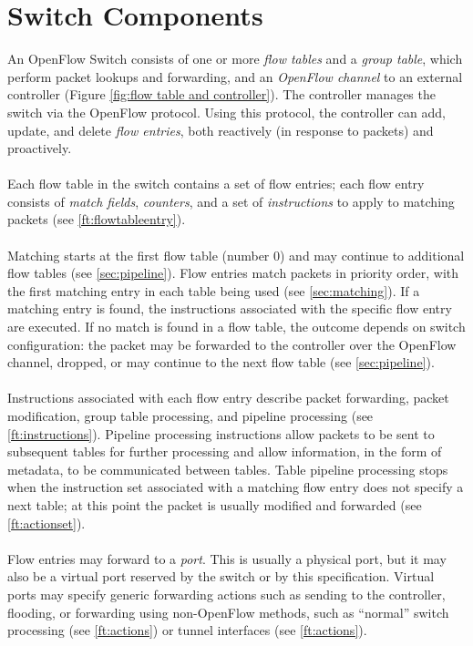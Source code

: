 \documentclass[10pt]{article}
\begin{document}
\section{Switch Components}
An OpenFlow Switch consists of one or more \emph{flow tables} and a \emph{group table}, which perform packet lookups and forwarding, and an \emph{OpenFlow channel} to an external controller (Figure \ref{fig:flow table and controller}).  The controller manages the switch via the OpenFlow protocol.   Using this protocol, the controller can add, update, and delete \emph{flow entries}, both reactively (in response to packets) and proactively.
\\\\
Each flow table in the switch contains a set of flow entries; each flow entry consists of \emph{match fields}, \emph{counters}, and a set of \emph{instructions} to apply to matching packets (see \ref{ft:flowtableentry}).
\\\\
Matching starts at the first flow table (number 0) and may continue to additional flow tables (see \ref{sec:pipeline}). Flow entries match packets in priority order, with the first matching entry in each table being used (see \ref{sec:matching}). If a matching entry is found, the instructions associated with the specific flow entry are executed. If no match is found in a flow table, the outcome depends on switch configuration: the packet may be forwarded to the controller over the OpenFlow channel, dropped, or may continue to the next flow table (see \ref{sec:pipeline}).
\\\\
Instructions associated with each flow entry describe packet forwarding, packet modification, group table processing, and pipeline processing (see \ref{ft:instructions}). Pipeline processing instructions allow packets to be sent to subsequent tables for further processing and allow information, in the form of metadata, to be communicated between tables. Table pipeline processing stops when the instruction set associated with a matching flow entry does not specify a next table; at this point the packet is usually modified and forwarded (see \ref{ft:actionset}).
\\\\
Flow entries may forward to a \emph{port}. This is usually a physical port, but it may also be a virtual port reserved by the switch or by this specification. Virtual ports may specify generic forwarding actions such as sending to the controller, flooding, or forwarding using non-OpenFlow methods, such as ``normal'' switch processing (see \ref{ft:actions}) or tunnel interfaces (see \ref{ft:actions}).
\end{document}
